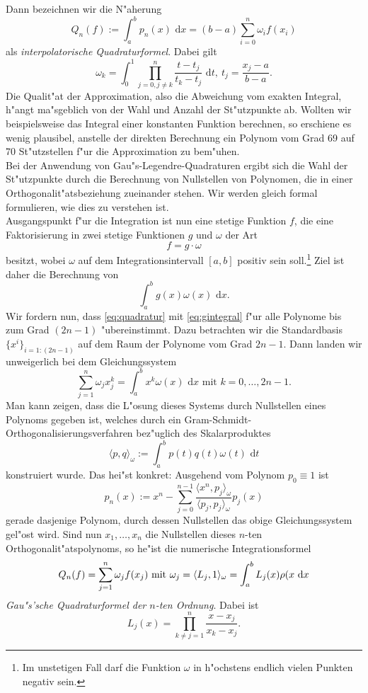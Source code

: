 Dann bezeichnen wir die N"aherung
\begin{equation}\label{eq:quadratur}
Q_n(f) := \int_a^b p_n (x)\text{ d}x =
(b-a)\sum_{i=0}^n \omega_i f(x_i)
\end{equation}
als \emph{interpolatorische Quadraturformel}. Dabei gilt
\[
\omega_k = \int_0^1 \prod_{j=0,j\neq k}^n
\frac{t-t_j}{t_k - t_j} \text{ d}t, \ t_j
= \frac{x_j-a}{b-a}.
\]
Die Qualit"at der Approximation, also die Abweichung vom exakten Integral, h"angt ma"sgeblich von der Wahl und Anzahl der St"utzpunkte ab. Wollten wir
beispielsweise das Integral einer konstanten Funktion berechnen, so erschiene es wenig plausibel, anstelle der direkten Berechnung ein Polynom vom Grad 69 auf 70 St"utzstellen f"ur die Approximation zu bem"uhen.\\

Bei der Anwendung von Gau"s-Legendre-Quadraturen ergibt sich die Wahl der St"utzpunkte durch die Berechnung von Nullstellen von Polynomen, die in einer Orthogonalit"atsbeziehung zueinander stehen.
Wir werden gleich formal formulieren, wie dies zu verstehen ist.\\

Ausgangspunkt f"ur die Integration ist nun eine stetige Funktion $f$, die eine Faktorisierung in zwei stetige Funktionen $g$ und $\omega$ der Art
\[
f = g\cdot \omega
\]
besitzt, wobei $\omega$ auf dem Integrationsintervall $[a,b]$ positiv sein soll.\footnote{Im unstetigen Fall darf die Funktion $\omega$ in h"ochstens endlich vielen Punkten negativ sein.} Ziel ist daher die Berechnung von
\begin{equation}\label{eq:gintegral}
\int_a^b g(x)\omega(x) \text{ d}x.
\end{equation}
Wir fordern nun, dass \eqref{eq:quadratur} mit \eqref{eq:gintegral} f"ur alle Polynome bis zum Grad $(2n-1)$ "ubereinstimmt.
Dazu betrachten wir die Standardbasis $\{x^i\}_{i=1:(2n-1)}$ auf dem Raum der Polynome vom
Grad $2n-1$. Dann landen wir unweigerlich bei dem
Gleichungssystem
\[
\sum_{j=1}^n \omega_j x_j^k = \int_a^b x^k \omega(x) \text{ d}x \text{ mit } k = 0,\ldots,2n-1.
\]
Man kann zeigen, dass die L"osung dieses Systems durch Nullstellen eines Polynoms gegeben ist, welches durch
ein Gram-Schmidt-Orthogonalisierungsverfahren bez"uglich des Skalarproduktes
\[
\langle p,q\rangle_\omega := \int_a^b p(t) q(t)\omega(t) \text{ d}t
\]
konstruiert wurde. Das hei"st konkret: Ausgehend vom Polynom $p_0 \equiv 1$ ist
\[
p_n(x) := x^n - \sum_{j=0}^{n-1} \frac{\langle x^n, p_j \rangle_\omega}{\langle p_j, p_j\rangle_\omega} p_j (x)
\]
gerade dasjenige Polynom, durch dessen Nullstellen das obige Gleichungssystem gel"ost wird. Sind nun
$x_1,\ldots,x_n$ die Nullstellen dieses $n$-ten Orthogonalit"atspolynoms, so he"ist die numerische
Integrationsformel
\[
Q_n(f) = \sum_{j=1}^n \omega_j f(x_j) \text{ mit }
\omega_j = \langle L_j, 1 \rangle_\omega
= \int_a^b L_j(x)\rho(x\text{ d}x
\]
\emph{Gau"s'sche Quadraturformel der $n$-ten Ordnung}.
Dabei ist
\[
L_j(x) = \prod_{k\neq j=1}^n \frac{x-x_j}{x_k - x_j}.
\]

